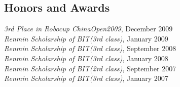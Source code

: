 \documentclass[margin]{res}
\begin{document}
\begin{resume}
\section{Honors and Awards }             
             {\it 3rd Place in Robocup ChinaOpen2009}, December 2009 \\             
			 {\it Renmin Scholarship of BIT(3rd class)}, January 2009 \\            
			 {\it Renmin Scholarship of BIT(3rd class)}, September 2008 \\            
			 {\it Renmin Scholarship of BIT(3rd class)}, January 2008 \\            
			 {\it Renmin Scholarship of BIT(2rd class)}, September 2007 \\  
			 {\it Renmin Scholarship of BIT(3rd class)}, January 2007 \\  

\end{resume}
\end{document}
